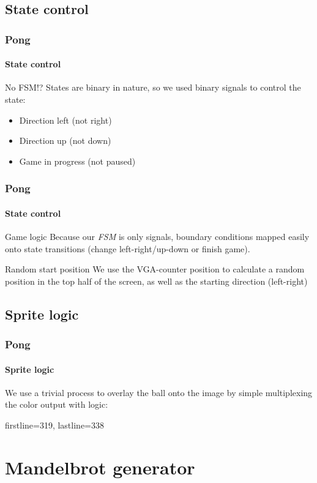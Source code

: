 \documentclass{beamer}
\begin{document}
\subsection{State control}
\begin{frame}
    \frametitle{Pong}
    \framesubtitle{State control}
    \begin{alertblock}{No FSM!?}
        States are binary in nature,
        so we used binary signals to control the state:
        \begin{itemize}
            \item Direction left (not right)
            \item Direction up (not down)
            \item Game in progress (not paused)
        \end{itemize}
    \end{alertblock}
\end{frame}

\begin{frame}
    \frametitle{Pong}
    \framesubtitle{State control }
    \begin{block}{Game logic}
        Because our \emph{FSM} is only signals,
        boundary conditions mapped easily onto state transitions (change left-right/up-down or finish game).
    \end{block}
    \begin{block}{Random start position}
        We use the VGA-counter position to calculate a random position in the top half of the screen,
        as well as the starting direction (left-right)
    \end{block}
\end{frame}

\subsection{Sprite logic}
\begin{frame}[fragile]
    \frametitle{Pong}
    \framesubtitle{Sprite logic}
    We use a trivial process to overlay the ball onto the image by simple multiplexing the color output with logic:
    
    firstline=319, lastline=338
\end{frame}



\section{Mandelbrot generator}
\begin{frame}
    \sectionpage
\end{frame}
\end{document}
